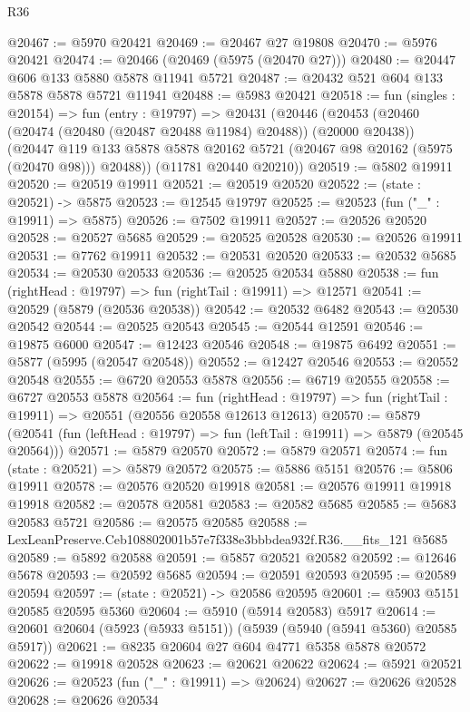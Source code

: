 \begin{lexlean}{R36}
\begin{coremodule}
@20467 := @5970 @20421
@20469 := @20467 @27 @19808
@20470 := @5976 @20421
@20474 := @20466 (@20469 (@5975 (@20470 @27)))
@20480 := @20447 @606 @133 @5880 @5878 @11941 @5721
@20487 := @20432 @521 @604 @133 @5878 @5878 @5721 @11941
@20488 := @5983 @20421
@20518 := fun (singles : @20154) =>
  fun (entry : @19797) =>
  @20431
    (@20446
      (@20453
        (@20460 (@20474 (@20480 (@20487 @20488 @11984) @20488)) (@20000 @20438))
        (@20447 @119 @133 @5878 @5878 @20162 @5721 (@20467 @98 @20162 (@5975 (@20470 @98))) @20488))
      (@11781 @20440 @20210))
@20519 := @5802 @19911
@20520 := @20519 @19911
@20521 := @20519 @20520
@20522 := (state : @20521) -> @5875
@20523 := @12545 @19797
@20525 := @20523 (fun ("_" : @19911) => @5875)
@20526 := @7502 @19911
@20527 := @20526 @20520
@20528 := @20527 @5685
@20529 := @20525 @20528
@20530 := @20526 @19911
@20531 := @7762 @19911
@20532 := @20531 @20520
@20533 := @20532 @5685
@20534 := @20530 @20533
@20536 := @20525 @20534 @5880
@20538 := fun (rightHead : @19797) => fun (rightTail : @19911) => @12571
@20541 := @20529 (@5879 (@20536 @20538))
@20542 := @20532 @6482
@20543 := @20530 @20542
@20544 := @20525 @20543
@20545 := @20544 @12591
@20546 := @19875 @6000
@20547 := @12423 @20546
@20548 := @19875 @6492
@20551 := @5877 (@5995 (@20547 @20548))
@20552 := @12427 @20546
@20553 := @20552 @20548
@20555 := @6720 @20553 @5878
@20556 := @6719 @20555
@20558 := @6727 @20553 @5878
@20564 := fun (rightHead : @19797) =>
  fun (rightTail : @19911) => @20551 (@20556 @20558 @12613 @12613)
@20570 := @5879
    (@20541 (fun (leftHead : @19797) => fun (leftTail : @19911) => @5879 (@20545 @20564)))
@20571 := @5879 @20570
@20572 := @5879 @20571
@20574 := fun (state : @20521) => @5879 @20572
@20575 := @5886 @5151
@20576 := @5806 @19911
@20578 := @20576 @20520 @19918
@20581 := @20576 @19911 @19918 @19918
@20582 := @20578 @20581
@20583 := @20582 @5685
@20585 := @5683 @20583 @5721
@20586 := @20575 @20585
@20588 := LexLeanPreserve.Ceb108802001b57e7f338e3bbbdea932f.R36.__fits_121 @5685
@20589 := @5892 @20588
@20591 := @5857 @20521 @20582
@20592 := @12646 @5678
@20593 := @20592 @5685
@20594 := @20591 @20593
@20595 := @20589 @20594
@20597 := (state : @20521) -> @20586 @20595
@20601 := @5903 @5151 @20585 @20595 @5360
@20604 := @5910 (@5914 @20583) @5917
@20614 := @20601 @20604 (@5923 (@5933 @5151)) (@5939 (@5940 (@5941 @5360) @20585 @5917))
@20621 := @8235 @20604 @27 @604 @4771 @5358 @5878 @20572
@20622 := @19918 @20528
@20623 := @20621 @20622
@20624 := @5921 @20521
@20626 := @20523 (fun ("_" : @19911) => @20624)
@20627 := @20626 @20528
@20628 := @20626 @20534

\end{coremodule}
\end{lexlean}
